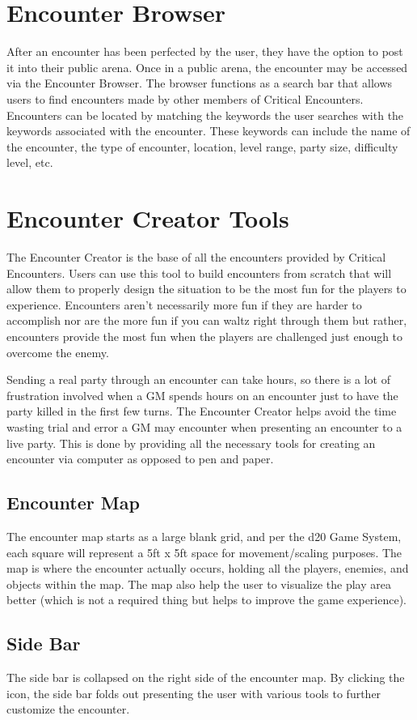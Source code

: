 \documentclass[12pt,a4paper]{report}
\begin{document}
	\section{Encounter Browser}
	After an encounter has been perfected by the user, they have the option to post it into their public arena. Once in a public arena, the encounter may be accessed via the Encounter Browser. The browser functions as a search bar that allows users to find encounters made by other members of Critical Encounters. Encounters can be located by matching the keywords the user searches with the keywords associated with the encounter. These keywords can include the name of the encounter, the type of encounter, location, level range, party size, difficulty level, etc.
	
	\section{Encounter Creator Tools}
	The Encounter Creator is the base of all the encounters provided by Critical Encounters. Users can use this tool to build encounters from scratch that will allow them to properly design the situation to be the most fun for the players to experience. Encounters aren't necessarily more fun if they are harder to accomplish nor are the more fun if you can waltz right through them but rather, encounters provide the most fun when the players are challenged just enough to overcome the enemy. 
	
	Sending a real party through an encounter can take hours, so there is a lot of frustration involved when a GM spends hours on an encounter just to have the party killed in the first few turns. The Encounter Creator helps avoid the time wasting trial and error a GM may encounter when presenting an encounter to a live party. This is done by providing all the necessary tools for creating an encounter via computer as opposed to pen and paper.
		\subsection{Encounter Map}
		The encounter map starts as a large blank grid, and per the d20 Game System, each square will represent a 5ft x 5ft space for movement/scaling purposes. The map is where the encounter actually occurs, holding all the players, enemies, and objects within the map. The map also help the user to visualize the play area better (which is not a required thing but helps to improve the game experience).  
		\subsection{Side Bar}
		The side bar is collapsed on the right side of the encounter map. By clicking the icon, the side bar folds out presenting the user with various tools to further customize the encounter.
\end{document}
